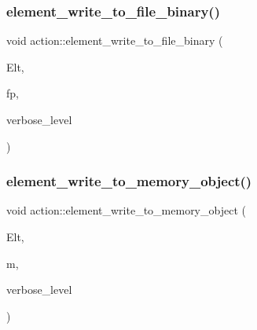\mbox{\label{classaction_a5d44cde73148588d64d772a7d23129a4}} 
\subsubsection{\texorpdfstring{element\+\_\+write\+\_\+to\+\_\+file\+\_\+binary()}{element\_write\_to\_file\_binary()}}
{\footnotesize\ttfamily void action\+::element\+\_\+write\+\_\+to\+\_\+file\+\_\+binary (\begin{DoxyParamCaption}\item[{\mbox{\hyperlink{galois_8h_a09fddde158a3a20bd2dcadb609de11dc}{I\+NT}} $\ast$}]{Elt,  }\item[{ofstream \&}]{fp,  }\item[{\mbox{\hyperlink{galois_8h_a09fddde158a3a20bd2dcadb609de11dc}{I\+NT}}}]{verbose\+\_\+level }\end{DoxyParamCaption})}

\mbox{\label{classaction_a62e8043937a582220b0170bbe5df46fa}} 
\subsubsection{\texorpdfstring{element\+\_\+write\+\_\+to\+\_\+memory\+\_\+object()}{element\_write\_to\_memory\_object()}}
{\footnotesize\ttfamily void action\+::element\+\_\+write\+\_\+to\+\_\+memory\+\_\+object (\begin{DoxyParamCaption}\item[{\mbox{\hyperlink{galois_8h_a09fddde158a3a20bd2dcadb609de11dc}{I\+NT}} $\ast$}]{Elt,  }\item[{\mbox{\hyperlink{classmemory__object}{memory\+\_\+object}} $\ast$}]{m,  }\item[{\mbox{\hyperlink{galois_8h_a09fddde158a3a20bd2dcadb609de11dc}{I\+NT}}}]{verbose\+\_\+level }\end{DoxyParamCaption})}

\mbox{\label{classaction_a45180e8a7fa109a1456a47e04c5ba4e9}} 

